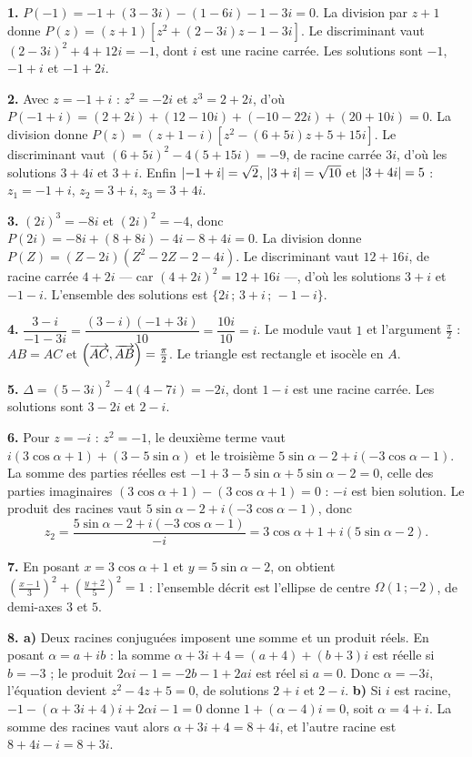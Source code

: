 \begin{corrige}[annales]
\textbf{1.} $P(-1) = -1+(3-3i)-(1-6i)-1-3i = 0$. La division par $z+1$ donne
$P(z) = (z+1)\left[z^{2}+(2-3i)z-1-3i\right]$. Le discriminant vaut
$(2-3i)^{2}+4+12i = -1$, dont $i$ est une racine carrée. Les solutions sont
$-1$, $-1+i$ et $-1+2i$.

\textbf{2.} Avec $z = -1+i$ : $z^{2} = -2i$ et $z^{3} = 2+2i$, d'où
$P(-1+i) = (2+2i)+(12-10i)+(-10-22i)+(20+10i) = 0$. La division donne
$P(z) = (z+1-i)\left[z^{2}-(6+5i)z+5+15i\right]$. Le discriminant vaut
$(6+5i)^{2}-4(5+15i) = -9$, de racine carrée $3i$, d'où les solutions
$3+4i$ et $3+i$. Enfin $\left|-1+i\right| = \sqrt2$, $\left|3+i\right| = \sqrt{10}$ et
$\left|3+4i\right| = 5$ : $z_{1} = -1+i$, $z_{2} = 3+i$, $z_{3} = 3+4i$.

\textbf{3.} $(2i)^{3} = -8i$ et $(2i)^{2} = -4$, donc
$P(2i) = -8i+(8+8i)-4i-8+4i = 0$. La division donne
$P(Z) = (Z-2i)\left(Z^{2}-2Z-2-4i\right)$. Le discriminant vaut $12+16i$, de
racine carrée $4+2i$ — car $(4+2i)^{2} = 12+16i$ —, d'où les solutions
$3+i$ et $-1-i$. L'ensemble des solutions est
$\{2i\,;\,3+i\,;\,-1-i\}$.

\textbf{4.} $\dfrac{3-i}{-1-3i} = \dfrac{(3-i)(-1+3i)}{10} = \dfrac{10i}{10}
= i$. Le module vaut $1$ et l'argument $\frac{\pi}{2}$ : $AB = AC$ et
$\left(\overrightarrow{AC},\overrightarrow{AB}\right) = \frac{\pi}{2}$. Le triangle est rectangle
et isocèle en $A$.

\textbf{5.} $\Delta = (5-3i)^{2}-4(4-7i) = -2i$, dont $1-i$ est une racine
carrée. Les solutions sont $3-2i$ et $2-i$.

\textbf{6.} Pour $z = -i$ : $z^{2} = -1$, le deuxième terme vaut
$i(3\cos\alpha+1)+(3-5\sin\alpha)$ et le troisième
$5\sin\alpha-2+i(-3\cos\alpha-1)$. La somme des parties réelles est
$-1+3-5\sin\alpha+5\sin\alpha-2 = 0$, celle des parties imaginaires
$(3\cos\alpha+1)-(3\cos\alpha+1) = 0$ : $-i$ est bien solution. Le produit
des racines vaut $5\sin\alpha-2+i(-3\cos\alpha-1)$, donc
\[
  z_{2} = \frac{5\sin\alpha-2+i(-3\cos\alpha-1)}{-i}
  = 3\cos\alpha+1+i\left(5\sin\alpha-2\right).
\]

\textbf{7.} En posant $x = 3\cos\alpha+1$ et $y = 5\sin\alpha-2$, on obtient
$\left(\frac{x-1}{3}\right)^{2}+\left(\frac{y+2}{5}\right)^{2} = 1$ :
l'ensemble décrit est l'ellipse de centre $\Omega(1\,;-2)$, de demi-axes $3$
et $5$.

\textbf{8. a)} Deux racines conjuguées imposent une somme et un produit
réels. En posant $\alpha = a+ib$ : la somme $\alpha+3i+4 = (a+4)+(b+3)i$ est
réelle si $b = -3$ ; le produit $2\alpha i-1 = -2b-1+2ai$ est réel si
$a = 0$. Donc $\alpha = -3i$, l'équation devient $z^{2}-4z+5 = 0$, de
solutions $2+i$ et $2-i$.
\textbf{b)} Si $i$ est racine, $-1-(\alpha+3i+4)i+2\alpha i-1 = 0$ donne
$1+(\alpha-4)i = 0$, soit $\alpha = 4+i$. La somme des racines vaut alors
$\alpha+3i+4 = 8+4i$, et l'autre racine est $8+4i-i = 8+3i$.


\end{corrige}
